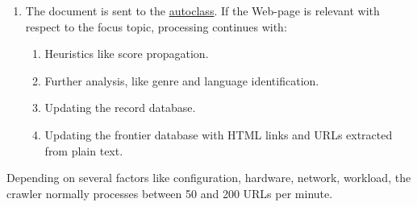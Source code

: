 \begin{enumerate}
\item The document is sent to the \hyperref{topic filter}{topic filter
(see section }{)}{autoclass}. If the 
Web-page is relevant with respect to the focus topic,
processing continues with:

\begin{enumerate}
\item Heuristics like score propagation.


\item Further analysis, like genre and language
  identification.

\item Updating the record database.

\item Updating the frontier database with HTML links and URLs
  extracted from plain text.%

\end{enumerate}

\end{enumerate}

Depending on several factors like configuration, hardware, network,
workload, the crawler normally processes between 50 and 200
URLs per minute.

